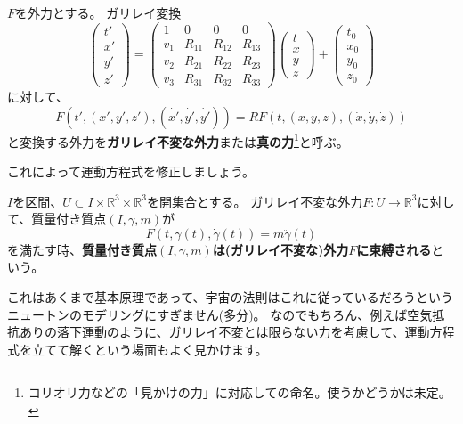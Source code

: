 \begin{definition}
  $F$を外力とする。
  ガリレイ変換
  \[
    \begin{pmatrix}
      t'\\x'\\y'\\z'
    \end{pmatrix}
    =
    \begin{pmatrix}
      1 & 0 & 0 & 0 \\
      v_1 & R_{11} & R_{12} & R_{13} \\
      v_2 & R_{21} & R_{22} & R_{23} \\
      v_3 & R_{31} & R_{32} & R_{33}
    \end{pmatrix}
    \begin{pmatrix}
      t\\x\\y\\z
    \end{pmatrix}
    +
    \begin{pmatrix}
      t_0\\x_0\\y_0\\z_0
    \end{pmatrix}
  \]
  に対して、
  \[
    F(t',(x',y',z'),(\dot{x'},\dot{y'},\dot{y'}))=RF(t,(x,y,z),(\dot{x},\dot{y},\dot{z}))
  \]
  と変換する外力を\textbf{ガリレイ不変な外力}または\textbf{真の力}\footnote{
    コリオリ力などの「見かけの力」に対応しての命名。使うかどうかは未定。
  }と呼ぶ。
\end{definition}

これによって運動方程式を修正しましょう。
\begin{definition}[運動方程式]
  $I$を区間、$U\subset I\times\mathbb{R}^3\times\mathbb{R}^3$を開集合とする。
  ガリレイ不変な外力$F:U\to\mathbb{R}^3$に対して、質量付き質点$(I,\gamma,m)$が
  \[
    F(t,\gamma(t),\dot\gamma(t))=m\ddot\gamma(t)
  \]
  を満たす時、\textbf{質量付き質点$(I,\gamma,m)$は(ガリレイ不変な)外力$F$に束縛される}という。
\end{definition}

これはあくまで基本原理であって、宇宙の法則はこれに従っているだろうというニュートンのモデリングにすぎません(多分)。
なのでもちろん、例えば空気抵抗ありの落下運動のように、ガリレイ不変とは限らない力を考慮して、運動方程式を立てて解くという場面もよく見かけます。
